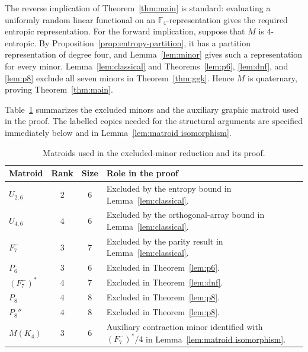 \documentclass[preprint,12pt]{elsarticle}
\theoremstyle{definition}
\newcommand{\F}{\mathbb F}
\begin{document}
The reverse implication of Theorem~\ref{thm:main} is standard: evaluating a
uniformly random linear functional on an $\F_4$-representation gives the
required entropic representation. For the forward implication, suppose that
$M$ is $4$-entropic. By Proposition~\ref{prop:entropy-partition}, it has a
partition representation of degree four, and Lemma~\ref{lem:minor} gives such
a representation for every minor. Lemma~\ref{lem:classical} and
Theorems~\ref{lem:p6}, \ref{lem:dnf}, and \ref{lem:p8} exclude all seven
minors in Theorem~\ref{thm:ggk}. Hence $M$ is quaternary, proving
Theorem~\ref{thm:main}.

Table~\ref{tab:matroids} summarizes the excluded minors and the auxiliary
graphic matroid used in the proof. The labelled copies needed for the
structural arguments are specified immediately below and in
Lemma~\ref{lem:matroid isomorphism}.

\begin{table}[ht]
\centering
\caption{Matroids used in the excluded-minor reduction and its proof.}
\label{tab:matroids}
\small
\begin{tabular}{@{}lcc>{\raggedright\arraybackslash}p{}@{}}
\hline
Matroid & Rank & Size & Role in the proof \\
\hline
$U_{2,6}$ & $2$ & $6$ & Excluded by the entropy bound in Lemma~\ref{lem:classical}. \\
$U_{4,6}$ & $4$ & $6$ & Excluded by the orthogonal-array bound in Lemma~\ref{lem:classical}. \\
$F_7^-$ & $3$ & $7$ & Excluded by the parity result in Lemma~\ref{lem:classical}. \\
$P_6$ & $3$ & $6$ & Excluded in Theorem~\ref{lem:p6}. \\
$(F_7^-)^*$ & $4$ & $7$ & Excluded in Theorem~\ref{lem:dnf}. \\
$P_8$ & $4$ & $8$ & Excluded in Theorem~\ref{lem:p8}. \\
$P_8''$ & $4$ & $8$ & Excluded in Theorem~\ref{lem:p8}. \\
$M(K_4)$ & $3$ & $6$ & Auxiliary contraction minor identified with $(F_7^-)^*/4$ in Lemma~\ref{lem:matroid isomorphism}. \\
\hline
\end{tabular}
\end{table}
\end{document}
